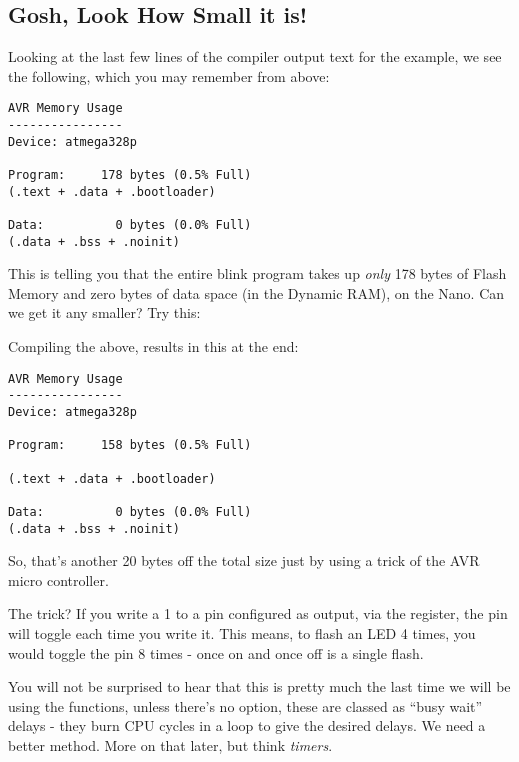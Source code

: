 \subsection{Gosh, Look How Small it is!}\label{gosh-look-how-small-it-is}

Looking at the last few lines of the compiler output text for the  example, we see the following, which you may remember from above:

\begin{lstlisting}[firstnumber=14]
AVR Memory Usage
----------------
Device: atmega328p

Program:     178 bytes (0.5% Full)
(.text + .data + .bootloader)

Data:          0 bytes (0.0% Full)
(.data + .bss + .noinit)
\end{lstlisting}

This is telling you that the entire blink program takes up \emph{only}
178 bytes of Flash Memory and zero bytes of data space (in the Dynamic
RAM), on the Nano.  Can we get it any smaller? Try this:




Compiling the above, results in this at the end:

\begin{lstlisting}[firstnumber=14]
AVR Memory Usage
----------------
Device: atmega328p

Program:     158 bytes (0.5% Full)

(.text + .data + .bootloader)

Data:          0 bytes (0.0% Full)
(.data + .bss + .noinit)
\end{lstlisting}

So, that's another 20 bytes off the total size just by using a trick of the AVR micro controller.

The trick? If you write a 1 to a pin configured as output, via the  register, the pin will toggle each time you write it. This means, to flash an LED 4 times, you would toggle the pin 8 times - once on and once off is a single flash.

\begin{note}
	You will not be surprised to hear that this is pretty much the last time we will be using the  functions, unless there's no option, these are classed as ``busy wait'' delays - they burn CPU cycles in a loop to give the desired delays. We need a better method. More on that later, but think \emph{timers}.
\end{note}

